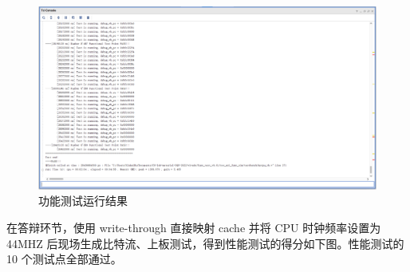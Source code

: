 \begin{figure}[H]
    \centering
    \includegraphics[width=1\linewidth]{image/通过功能测试.png}
    \caption{功能测试运行结果}
    \label{fig:通过功能测试}
\end{figure}

在答辩环节，使用 write-through 直接映射 cache 并将 CPU 时钟频率设置为 44MHZ 后现场生成比特流、上板测试，得到性能测试的得分如下图。性能测试的 10 个测试点全部通过。

